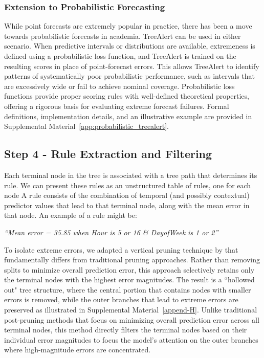 \documentclass[12pt]{article}
\begin{document}
\subsubsection{Extension to Probabilistic Forecasting}

While point forecasts are extremely popular in practice, there has been a move towards probabilistic forecasts in academia. TreeAlert can be used in either scenario. When predictive intervals or distributions are available, extremeness is defined using a probabilistic loss function, and TreeAlert is trained on the resulting scores in place of point-forecast errors. This allows TreeAlert to identify patterns of systematically poor probabilistic performance, such as intervals that are excessively wide or fail to achieve nominal coverage. Probabilistic loss functions provide proper scoring rules with well-defined theoretical properties, offering a rigorous basis for evaluating extreme forecast failures. Formal definitions, implementation details, and an illustrative example are provided in Supplemental Material~\ref{app:probabilistic_treealert}.

\subsection{Step 4 - Rule Extraction and Filtering}
\label{sec:rule-extraction}
Each terminal node in the tree is associated with a tree path that determines its rule. We can present these rules as an unstructured table of rules, one for each node %
A rule consists of the combination of temporal (and possibly contextual) predictor values that lead to that terminal node, along with the mean error in that node. An example of a rule might be: 
\begin{center}
\textit{``Mean error = 35.85 when Hour is 5 or 16 \& DayofWeek is 1 or 2''}
\end{center}

To isolate extreme errors, we adapted a vertical pruning technique by \cite{danks2024composite} that fundamentally differs from traditional pruning approaches. Rather than removing splits to minimize overall prediction error, this approach selectively retains only the terminal nodes with the highest error magnitudes. The result is a ``hollowed out" tree structure, where the central portion that contains nodes with smaller errors is removed, while the outer branches that lead to extreme errors are preserved as illustrated in Supplemental Material~\ref{append-H}. Unlike traditional post-pruning methods that focus on minimizing overall prediction error across all terminal nodes, this method directly filters the terminal nodes based on their individual error magnitudes to focus the model’s attention on the outer branches where high-magnitude errors are concentrated.
\end{document}
